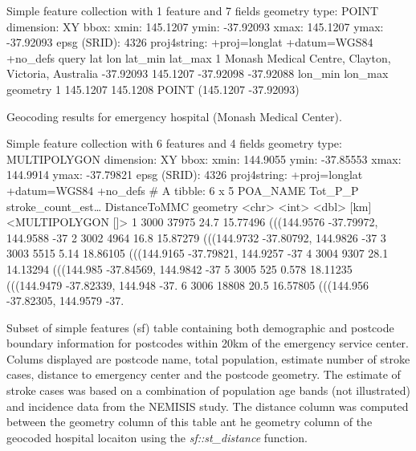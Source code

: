 \documentclass[utf8]{frontiersHLTH}
\begin{document}
\begin{table}[h]
\small
\begin{verbnobox}[\fontsize{8pt}{8pt}\selectfont]
Simple feature collection with 1 feature and 7 fields
geometry type:  POINT
dimension:      XY
bbox:           xmin: 145.1207 ymin: -37.92093 xmax: 145.1207 ymax: -37.92093
epsg (SRID):    4326
proj4string:    +proj=longlat +datum=WGS84 +no_defs
                                                query       lat      lon   lat_min   lat_max
1 Monash Medical Centre, Clayton, Victoria, Australia -37.92093 145.1207 -37.92098 -37.92088
   lon_min  lon_max                   geometry
1 145.1207 145.1208 POINT (145.1207 -37.92093)
\end{verbnobox}
\normalsize
\caption{Geocoding results for emergency hospital (Monash Medical Center).\label{tab:GeocodeMMC}}
\end{table}

\begin{table}[h]
\begin{verbnobox}[\fontsize{8pt}{8pt}\selectfont]
Simple feature collection with 6 features and 4 fields
geometry type:  MULTIPOLYGON
dimension:      XY
bbox:           xmin: 144.9055 ymin: -37.85553 xmax: 144.9914 ymax: -37.79821
epsg (SRID):    4326
proj4string:    +proj=longlat +datum=WGS84 +no_defs
# A tibble: 6 x 5
  POA_NAME Tot_P_P stroke_count_est… DistanceToMMC                             geometry
  <chr>      <int>             <dbl>          [km]                   <MULTIPOLYGON []>
1 3000       37975            24.7        15.77496 (((144.9576 -37.79972, 144.9588 -37
2 3002        4964            16.8        15.87279 (((144.9732 -37.80792, 144.9826 -37
3 3003        5515             5.14       18.86105 (((144.9165 -37.79821, 144.9257 -37
4 3004        9307            28.1        14.13294 (((144.985 -37.84569, 144.9842 -37
5 3005         525             0.578      18.11235 (((144.9479 -37.82339, 144.948 -37.
6 3006       18808            20.5        16.57805 (((144.956 -37.82305, 144.9579 -37.
\end{verbnobox}
\caption{Subset of simple features (sf) table containing both demographic and postcode boundary information for postcodes within 20km of the emergency service center. Colums displayed are postcode name, total population, estimate number of stroke cases, distance to emergency center and the postcode geometry. The estimate of stroke cases was based on a combination of population age bands (not illustrated) and incidence data from the NEMISIS study. The distance column was computed between the geometry column of this table ant he geometry column of the geocoded hospital locaiton using the {\em sf::st\_distance} function.\label{tab:MMC20}}
\end{table}
\end{document}
